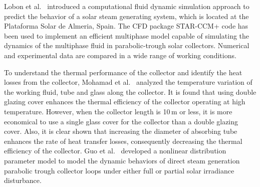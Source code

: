 Lobon et al.~\cite{Lobon2014} introduced a computational fluid dynamic simulation approach to predict the behavior of a solar steam generating system, which is located at the Plataforma Solar de Almeria, Spain. The CFD package STAR-CCM+ code has been used to implement an efficient multiphase model capable of simulating the dynamics of the multiphase fluid in parabolic-trough solar collectors. Numerical and experimental data are compared in a wide range of working conditions.

To understand the thermal performance of the collector and identify the heat losses from the collector, Mohamad et al.~\cite{Mohamad2014} analyzed the temperature variation of the working fluid, tube and glass along the collector. It is found that using double glazing cover enhances the thermal efficiency of the collector operating at high temperature. However, when the collector length is 10$\,\mathrm{m}$ or less, it is more economical to use a single glass cover for the collector than a double glazing cover.
Also, it is clear shown that increasing the diameter of absorbing tube enhances the rate of heat transfer losses, consequently decreasing the thermal efficiency of the collector.
Guo et al.~\cite{SuGuo2016} developed a nonlinear distribution parameter model to model the dynamic behaviors of direct steam generation parabolic trough collector loops under either full or partial solar irradiance disturbance.

